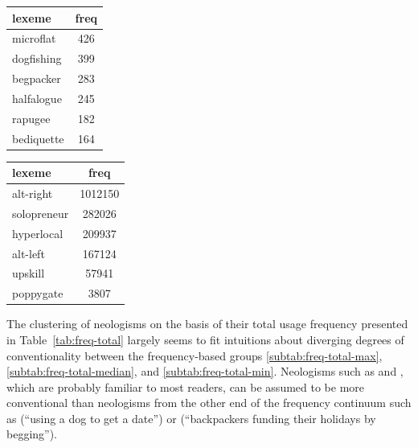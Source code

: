 \documentclass[
  a4paper,
  abstract=on,
  captions=tableabove
  ]{scrartcl}
\begin{document}
\begin{table}
      \vspace{\baselineskip}

        \begin{subtable}{.45\linewidth}
          \label{subtab:freq-total-min}
          \centering
          \begin{tabular}{l S[table-format=3]}
            \toprule
            lexeme               & {freq} \\
            \midrule
            microflat            & 426    \\
            dogfishing           & 399    \\
            begpacker            & 283    \\
            halfalogue           & 245    \\
            rapugee              & 182    \\
            bediquette           & 164    \\
            \bottomrule
          \end{tabular}
        \end{subtable}
        \hfill
        \begin{subtable}{.45\linewidth}
          \label{subtab:freq-total-cases}
          \centering
          \begin{tabular}{l S[table-format=7]}
            \toprule
            lexeme       & {freq}  \\
            \midrule
            alt-right    & 1012150 \\
            solopreneur  & 282026  \\
            hyperlocal   & 209937  \\
            alt-left     & 167124  \\
            upskill      & 57941   \\
            poppygate    & 3807    \\
            \bottomrule
          \end{tabular}
        \end{subtable}
      \end{table}

      The clustering of neologisms on the basis of their total usage frequency presented in Table~\ref{tab:freq-total} largely seems to fit intuitions about diverging degrees of conventionality between the frequency-based groups \ref{subtab:freq-total-max}, \ref{subtab:freq-total-median}, and \ref{subtab:freq-total-min}. Neologisms such as  and , which are probably familiar to most readers, can be assumed to be more conventional than neologisms from the other end of the frequency continuum such as  (\enquote{using a dog to get a date}) or  (\enquote{backpackers funding their holidays by begging}).
\end{document}
